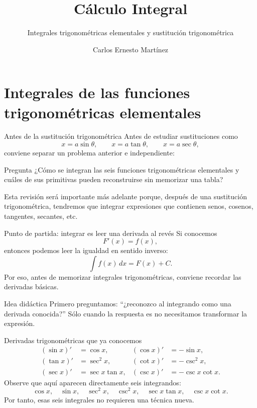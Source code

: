 \documentclass[10pt,aspectratio=169]{beamer}
\title{Cálculo Integral}
\subtitle{Integrales trigonométricas elementales y sustitución trigonométrica}
\author{Carlos Ernesto Martínez}
\institute{Tecnológico Nacional de México}
\date{}
\begin{document}
\begin{frame}\titlepage\end{frame}


\section{Integrales de las funciones trigonométricas elementales}

\begin{frame}{Antes de la sustitución trigonométrica}
Antes de estudiar sustituciones como
\[
x=a\sin\theta,\qquad x=a\tan\theta,\qquad x=a\sec\theta,
\]
conviene separar un problema anterior e independiente:
\begin{block}{Pregunta}
¿Cómo se integran las seis funciones trigonométricas elementales y cuáles de sus primitivas pueden reconstruirse sin memorizar una tabla?
\end{block}
Esta revisión será importante más adelante porque, después de una sustitución trigonométrica, tendremos que integrar expresiones que contienen senos, cosenos, tangentes, secantes, etc.
\end{frame}

\begin{frame}{Punto de partida: integrar es leer una derivada al revés}
Si conocemos
\[
F'(x)=f(x),
\]
entonces podemos leer la igualdad en sentido inverso:
\[
\boxed{\int f(x)\,dx=F(x)+C.}
\]
Por eso, antes de memorizar integrales trigonométricas, conviene recordar las derivadas básicas.
\begin{block}{Idea didáctica}
Primero preguntamos: ``¿reconozco al integrando como una derivada conocida?'' Sólo cuando la respuesta es no necesitamos transformar la expresión.
\end{block}
\end{frame}

\begin{frame}{Derivadas trigonométricas que ya conocemos}
\small
\[
\boxed{
\begin{aligned}
(\sin x)'&=\cos x, & (\cos x)'&=-\sin x,\\[1mm]
(\tan x)'&=\sec^2x, & (\cot x)'&=-\csc^2x,\\[1mm]
(\sec x)'&=\sec x\tan x, & (\csc x)'&=-\csc x\cot x.
\end{aligned}}
\]
Observe que aquí aparecen directamente seis integrandos:
\[
\cos x,\quad \sin x,\quad \sec^2x,\quad \csc^2x,
\quad \sec x\tan x,\quad \csc x\cot x.
\]
Por tanto, esas seis integrales no requieren una técnica nueva.
\end{frame}
\end{document}
